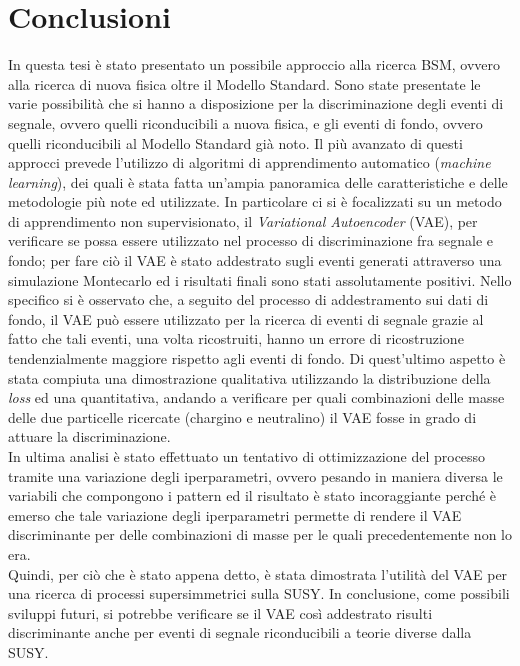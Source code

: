 
\section{Conclusioni}
\label{sec:conclusioni}

In questa tesi è stato presentato un possibile approccio alla ricerca BSM, ovvero alla ricerca di nuova fisica oltre il Modello Standard. Sono state presentate le varie possibilità che si hanno a disposizione per la discriminazione degli eventi di segnale, ovvero quelli riconducibili a nuova fisica, e gli eventi di fondo, ovvero quelli riconducibili al Modello Standard già noto. Il più avanzato di questi approcci prevede l'utilizzo di algoritmi di apprendimento automatico (\textit{machine learning}), dei quali è stata fatta un'ampia panoramica delle caratteristiche e delle metodologie più note ed utilizzate. In particolare ci si è focalizzati su un metodo di apprendimento non supervisionato, il \textit{Variational Autoencoder} (VAE), per verificare se possa essere utilizzato nel processo di discriminazione fra segnale e fondo; per fare ciò il VAE è stato addestrato sugli eventi generati attraverso una simulazione Montecarlo ed i risultati finali sono stati assolutamente positivi. Nello specifico si è osservato che, a seguito del processo di addestramento sui dati di fondo, il VAE può essere utilizzato per la ricerca di eventi di segnale grazie al fatto che tali eventi, una volta ricostruiti, hanno un errore di ricostruzione tendenzialmente maggiore rispetto agli eventi di fondo. Di quest'ultimo aspetto è stata compiuta una dimostrazione qualitativa utilizzando la distribuzione della \textit{loss} ed una quantitativa, andando a verificare per quali combinazioni delle masse delle due particelle ricercate (chargino e neutralino) il VAE fosse in grado di attuare la discriminazione.\\
In ultima analisi è stato effettuato un tentativo di ottimizzazione del processo tramite una variazione degli iperparametri, ovvero pesando in maniera diversa le variabili che compongono i pattern ed il risultato è stato incoraggiante perché è emerso che tale variazione degli iperparametri permette di rendere il VAE discriminante per delle combinazioni di masse per le quali precedentemente non lo era.\\
Quindi, per ciò che è stato appena detto, è stata dimostrata l'utilità del VAE per una ricerca di processi supersimmetrici sulla SUSY. In conclusione, come possibili sviluppi futuri, si potrebbe verificare se il VAE così addestrato risulti discriminante anche per eventi di segnale riconducibili a teorie diverse dalla SUSY.
